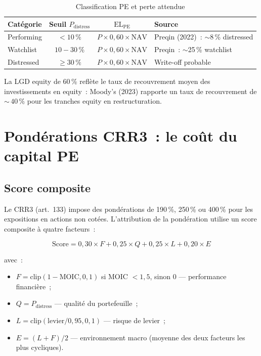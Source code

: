 \documentclass[12pt, a4paper, twoside, openright]{report}
\theoremstyle{definition}
\begin{document}
\begin{table}[htbp]
\centering
\caption{Classification PE et perte attendue}
\label{tab:pe-classif}
\begin{tabular}{lccl}
\toprule
Catégorie & Seuil $P_{\text{distress}}$ & $\text{EL}_{\text{PE}}$ & Source \\
\midrule
Performing & $< 10\,\%$ & $P \times 0{,}60 \times \text{NAV}$ & Preqin (2022)~: $\sim$8\,\% distressed \\
Watchlist & $10 - 30\,\%$ & $P \times 0{,}60 \times \text{NAV}$ & Preqin~: $\sim$25\,\% watchlist \\
Distressed & $\geq 30\,\%$ & $P \times 0{,}60 \times \text{NAV}$ & Write-off probable \\
\bottomrule
\end{tabular}
\end{table}

La LGD equity de 60\,\% reflète le taux de recouvrement moyen des investissements en equity~: Moody's (2023) rapporte un taux de recouvrement de ${\sim}\,40\,\%$ pour les tranches equity en restructuration.

\section{Pondérations CRR3~: le coût du capital PE}
\label{sec:pe:rw}

\subsection{Score composite}

Le CRR3 (art.~133) impose des pondérations de 190\,\%, 250\,\% ou 400\,\% pour les expositions en actions non cotées. L'attribution de la pondération utilise un score composite à quatre facteurs~:

\begin{equation}
\text{Score} = 0{,}30 \times F + 0{,}25 \times Q + 0{,}25 \times L + 0{,}20 \times E
\label{eq:pe-rw-score}
\end{equation}

\noindent avec~:
\begin{itemize}[nosep]
  \item $F = \text{clip}(1 - \text{MOIC}, 0, 1)$ si MOIC $< 1{,}5$, sinon $0$ --- performance financière~;
  \item $Q = P_{\text{distress}}$ --- qualité du portefeuille~;
  \item $L = \text{clip}(\text{levier}/0{,}95, 0, 1)$ --- risque de levier~;
  \item $E = (L + F)/2$ --- environnement macro (moyenne des deux facteurs les plus cycliques).
\end{itemize}
\end{document}
